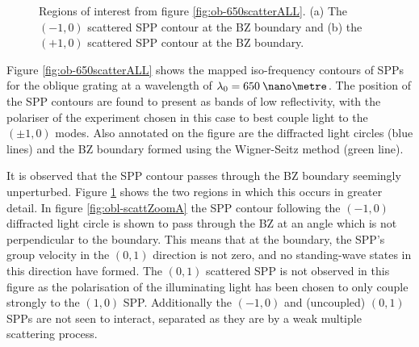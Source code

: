 \begin{figure}
\begin{center}
\end{center}
\caption[Regions of interest from figure \ref{fig:ob-650scatterALL}.]{Regions of interest from figure \ref{fig:ob-650scatterALL}. (a) The $(-1,0)$ scattered SPP contour at the BZ boundary and (b) the $(+1,0)$ scattered SPP contour at the BZ boundary.\label{fig:obl-scattZoom}}
\end{figure}

Figure \ref{fig:ob-650scatterALL} shows the mapped iso-frequency contours of SPPs for the oblique grating at a wavelength of $\lambda_0=650\:\nano\metre$. The position of the SPP contours are found to present as bands of low reflectivity, with the polariser of the experiment chosen in this case to best couple light to the $(\pm 1,0)$ modes. Also annotated on the figure are the diffracted light circles (blue lines) and the BZ boundary formed using the Wigner-Seitz method \cite{kittel1996introduction} (green line).

It is observed that the SPP contour passes through the BZ boundary  seemingly unperturbed. Figure \ref{fig:obl-scattZoom} shows the two regions in which this occurs in greater detail. In figure \ref{fig:obl-scattZoomA} the SPP contour following the $(-1,0)$ diffracted light circle is shown to pass through the BZ at an angle which is not perpendicular to the boundary. This means that at the boundary, the SPP's group velocity in the $(0,1)$ direction is not zero, and no standing-wave states in this direction have formed. The $(0,1)$ scattered SPP is not observed in this figure as the polarisation of the illuminating light has been chosen to only couple strongly to the $(1,0)$ SPP. Additionally the $(-1,0)$ and (uncoupled) $(0,1)$ SPPs are not seen to interact, separated as they are by a weak multiple scattering process. 

